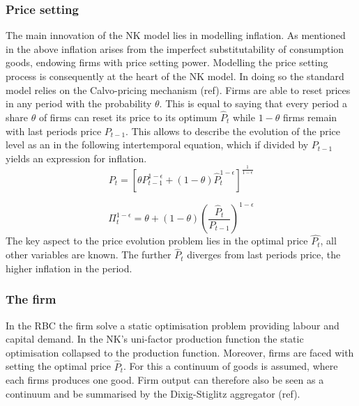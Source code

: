 \documentclass[12pt,a4paper,english]{article} %
\begin{document}
	\subsubsection{Price setting} \label{nk_price_setting}
	The main innovation of the NK model lies in modelling inflation. As mentioned in the above inflation arises from the imperfect substitutability of consumption goods, endowing firms with price setting power. Modelling the price setting process is consequently at the heart of the NK model. In doing so the standard model relies on the Calvo-pricing mechanism (ref). Firms are able to reset prices in any period with the probability $\theta$. This is equal to saying that every period a share $\theta$ of firms can reset its price to its optimum $\hat{P}_t$ while $1-\theta$ firms remain with last periods price $P_{t-1}$. This allows to describe the evolution of the price level as an in the following intertemporal equation, which if divided by $P_{t-1}$ yields an expression for inflation.
	\begin{equation}
		P_t = 
		\left[
		\theta P_{t-1}^{1 - \epsilon} + (1 - \theta) \hat{P}_t^{1 - \epsilon}
		\right]^{\frac{1}{1 - \epsilon}}
	\end{equation}

	\begin{equation} \label{eq:inflation}
		\Pi_t^{1-\epsilon} = \theta + (1 - \theta) \left(\frac{\hat{P}_t}{P_{t-1}} \right)^{1-\epsilon}
	\end{equation}
	The key aspect to the price evolution problem lies in the optimal price $\hat{P_t}$, all other variables are known. The further $\hat{P}_t$ diverges from last periods price, the higher inflation in the period. 
	
	\subsubsection{The firm} \label{nk_the_firm}
	In the RBC the firm solve a static optimisation problem providing labour and capital demand. In the NK's uni-factor production function the static optimisation collapsed to the production function. Moreover, firms are faced with setting the optimal price $\hat{P}_t$. For this a continuum of goods is assumed, where each firms produces one good. Firm output can therefore also be seen as a continuum and be summarised by the Dixig-Stiglitz aggregator (ref). 
	
\end{document}
